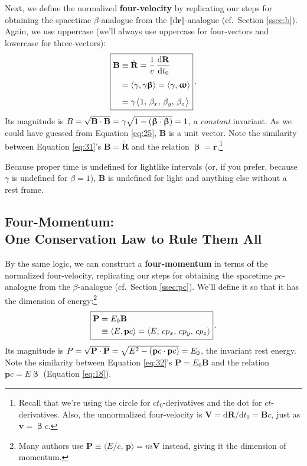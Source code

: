 \documentclass[12pt]{article}
\newcommand{\abs}[1]{\mathnormal \vv{#1}}
\renewcommand{\vv}[1]{\mathbf{#1}}
\newcommand{\dd}[1]{\mathrm{d}#1}
\newcommand{\vvbeta}{\bm{\upbeta}}
\newcommand{\vvomega}{\bm{\upomega}}
\begin{document}
Next, we define the normalized \textbf{four-velocity} by replicating our steps for obtaining the spacetime $\beta$-analogue from the $\Vert \dd \vv r \Vert$-analogue (cf.\ Section \ref{ssec:b}). Again, we use uppercase (we'll always use uppercase for four-vectors and lowercase for three-vectors):
\begin{equation}\label{eq:31}
\boxed{
\begin{aligned}
\vv B&\equiv \mathring{\vv R} = \dfrac{1}{c} \, \dfrac{\dd \vv R}{\dd t_0} \\[3pt]
&= \langle \gamma, \gamma \vvbeta \rangle = \langle \gamma, \mkern1mu \vvomega \rangle \\[4pt]
&= \gamma \mkern1.5mu \big \langle 1, \, \beta_x, \, \beta_y, \, \beta_z \big \rangle
\end{aligned}
} \, .
\end{equation}
Its magnitude is $\abs B = \sqrt{\vv B \cdot \vv B} = \gamma \sqrt{1 - (\vvbeta \cdot \vvbeta)} = 1$, a \emph{constant} invariant. As we could have guessed from Equation \ref{eq:25}, $\vv B$ is a unit vector. Note the similarity between Equation \ref{eq:31}'s $\vv B = \mathring{\vv R}$ and the relation $\vvbeta = \dot{\vv r}$.\footnote{Recall that we're using the circle for $c t_0$-derivatives and the dot for $ct$-derivatives. Also, the unnormalized four-velocity is $\vv V = \dd \vv R / \dd t_0 = \vv B c$, just as $\vv v = \vvbeta c$.}

Because proper time is undefined for lightlike intervals (or, if you prefer, because $\gamma$ is undefined for $\beta = 1$), $\vv B$ is undefined for light and anything else without a rest frame.


\subsection{Four-Momentum:\\ One Conservation Law to Rule Them All}

By the same logic, we can construct a \textbf{four-momentum} in terms of the normalized four-velocity, replicating our steps for obtaining the spacetime $p c$-analogue from the $\beta$-analogue (cf.\ Section \ref{ssec:pc}). We'll define it so that it has the dimension of energy:\footnote{Many authors use $\vv P \equiv \langle E/c , \, \vv p \rangle = m \vv V$ instead, giving it the dimension of momentum.}
\begin{equation}\label{eq:32}
\boxed{
\begin{aligned}
\vv P &= E_0 \vv B\\
&\equiv \langle E, \vv p c \rangle = \langle E, \, c \abs p_x, \, c \abs p_y, \, c \abs p_z \rangle
\end{aligned}
} \, .
\end{equation}
Its magnitude is $\abs P = \sqrt{\vv P \cdot \vv P} = \sqrt{E^2 - (\vv p c \cdot \vv p c)} = E_0$, the invariant rest energy. Note the similarity between Equation \ref{eq:32}'s $\vv P = E_0 \vv B$ and the relation $\vv p c = E \vvbeta$ (Equation \ref{eq:18}).
\end{document}
